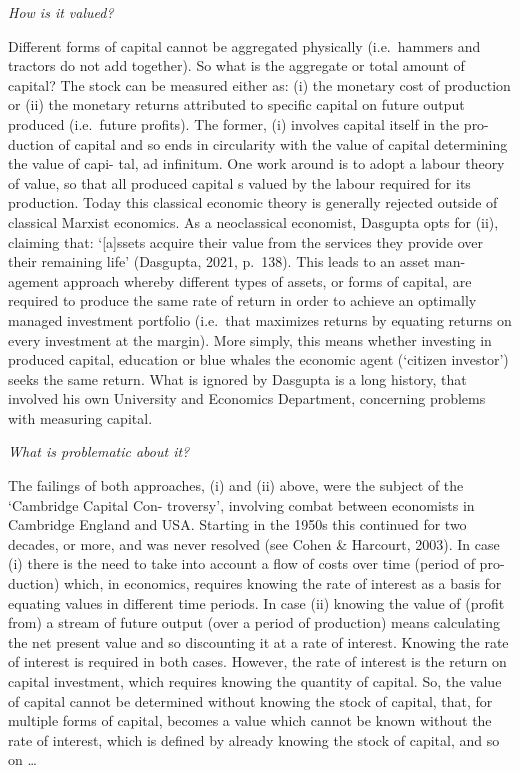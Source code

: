 \documentclass[
]{book}
\begin{document}
\emph{How is it valued?}

Different forms of capital cannot be aggregated physically (i.e.~hammers and tractors do not add
together). So what is the aggregate or total amount of capital? The stock can be measured either
as: (i) the monetary cost of production or (ii) the monetary returns attributed to specific capital
on future output produced (i.e.~future profits). The former, (i) involves capital itself in the pro-
duction of capital and so ends in circularity with the value of capital determining the value of capi-
tal, ad infinitum. One work around is to adopt a labour theory of value, so that all produced capital
s valued by the labour required for its production. Today this classical economic theory is generally
rejected outside of classical Marxist economics.
As a neoclassical economist, Dasgupta opts for (ii), claiming that: `{[}a{]}ssets acquire their value from
the services they provide over their remaining life' (Dasgupta, 2021, p.~138). This leads to an asset man-
agement approach whereby different types of assets, or forms of capital, are required to produce the
same rate of return in order to achieve an optimally managed investment portfolio (i.e.~that maximizes
returns by equating returns on every investment at the margin). More simply, this means whether
investing in produced capital, education or blue whales the economic agent (`citizen investor')
seeks the same return. What is ignored by Dasgupta is a long history, that involved his own University
and Economics Department, concerning problems with measuring capital.

\emph{What is problematic about it?}

The failings of both approaches, (i) and (ii) above, were the subject of the `Cambridge Capital Con-
troversy', involving combat between economists in Cambridge England and USA. Starting in the
1950s this continued for two decades, or more, and was never resolved (see Cohen \& Harcourt,
2003). In case (i) there is the need to take into account a flow of costs over time (period of pro-
duction) which, in economics, requires knowing the rate of interest as a basis for equating values
in different time periods. In case (ii) knowing the value of (profit from) a stream of future output
(over a period of production) means calculating the net present value and so discounting it at a rate
of interest. Knowing the rate of interest is required in both cases. However, the rate of interest is the
return on capital investment, which requires knowing the quantity of capital. So, the value of capital
cannot be determined without knowing the stock of capital, that, for multiple forms of capital,
becomes a value which cannot be known without the rate of interest, which is defined by already
knowing the stock of capital, and so on \ldots{}
\end{document}
